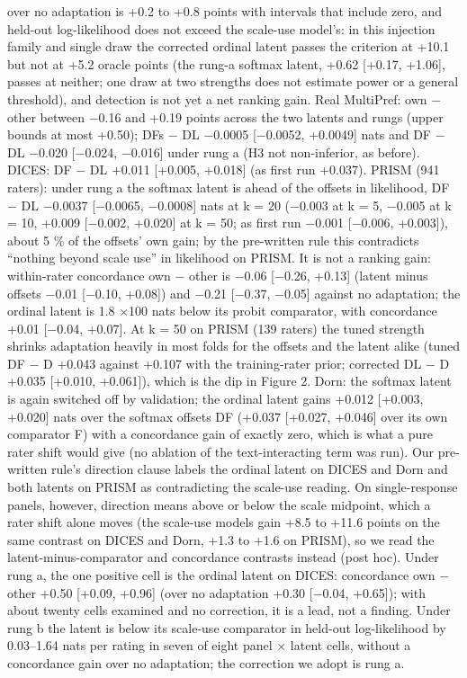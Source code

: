\documentclass{article}
\begin{document}
over no adaptation is +0.2 to +0.8 points with intervals that include zero, and held-out log-likelihood does not exceed the scale-use model's: in this injection family and single draw the corrected ordinal latent passes the criterion at +10.1 but not at +5.2 oracle points (the rung-a softmax latent, +0.62 {[}+0.17, +1.06{]}, passes at neither; one draw at two strengths does not estimate power or a general threshold), and detection is not yet a net ranking gain. Real MultiPref: own $-$ other between $-$0.16 and +0.19 points across the two latents and rungs (upper bounds at most +0.50); DFs $-$ DL $-$0.0005 {[}$-$0.0052, +0.0049{]} nats and DF $-$ DL $-$0.020 {[}$-$0.024, $-$0.016{]} under rung a (H3 not non-inferior, as before). DICES: DF $-$ DL +0.011 {[}+0.005, +0.018{]} (as first run +0.037). PRISM (941 raters): under rung a the softmax latent is ahead of the offsets in likelihood, DF $-$ DL $-$0.0037 {[}$-$0.0065, $-$0.0008{]} nats at k = 20 ($-$0.003 at k = 5, $-$0.005 at k = 10, +0.009 {[}$-$0.002, +0.020{]} at k = 50; as first run $-$0.001 {[}$-$0.006, +0.003{]}), about 5 \% of the offsets' own gain; by the pre-written rule this contradicts ``nothing beyond scale use'' in likelihood on PRISM. It is not a ranking gain: within-rater concordance own $-$ other is $-$0.06 {[}$-$0.26, +0.13{]} (latent minus offsets $-$0.01 {[}$-$0.10, +0.08{]}) and $-$0.21 {[}$-$0.37, $-$0.05{]} against no adaptation; the ordinal latent is 1.8 $\times$100 nats below its probit comparator, with concordance +0.01 {[}$-$0.04, +0.07{]}. At k = 50 on PRISM (139 raters) the tuned strength shrinks adaptation heavily in most folds for the offsets and the latent alike (tuned DF $-$ D +0.043 against +0.107 with the training-rater prior; corrected DL $-$ D +0.035 {[}+0.010, +0.061{]}), which is the dip in Figure 2. Dorn: the softmax latent is again switched off by validation; the ordinal latent gains +0.012 {[}+0.003, +0.020{]} nats over the softmax offsets DF (+0.037 {[}+0.027, +0.046{]} over its own comparator F) with a concordance gain of exactly zero, which is what a pure rater shift would give (no ablation of the text-interacting term was run). Our pre-written rule's direction clause labels the ordinal latent on DICES and Dorn and both latents on PRISM as contradicting the scale-use reading. On single-response panels, however, direction means above or below the scale midpoint, which a rater shift alone moves (the scale-use models gain +8.5 to +11.6 points on the same contrast on DICES and Dorn, +1.3 to +1.6 on PRISM), so we read the latent-minus-comparator and concordance contrasts instead (post hoc). Under rung a, the one positive cell is the ordinal latent on DICES: concordance own $-$ other +0.50 {[}+0.09, +0.96{]} (over no adaptation +0.30 {[}$-$0.04, +0.65{]}); with about twenty cells examined and no correction, it is a lead, not a finding. Under rung b the latent is below its scale-use comparator in held-out log-likelihood by 0.03--1.64 nats per rating in seven of eight panel $\times$ latent cells, without a concordance gain over no adaptation; the correction we adopt is rung a.
\end{document}
